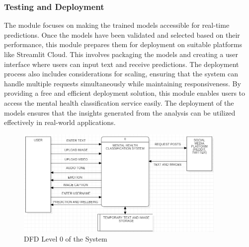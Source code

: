 \subsubsection{Testing and Deployment}
\noindent
The module focuses on making the trained models accessible for real-time predictions. Once the models have been validated and selected based on their performance, this module prepares them for deployment on suitable platforms like Streamlit Cloud. This involves packaging the models and creating a user interface where users can input text and receive predictions. The deployment process also includes considerations for scaling, ensuring that the system can handle multiple requests simultaneously while maintaining responsiveness. By providing a free and efficient deployment solution, this module enables users to access the mental health classification service easily. The deployment of the models ensures that the insights generated from the analysis can be utilized effectively in real-world applications.

\begin{figure}[h!]  
    \centering
    \includegraphics[width=0.9\textwidth]{Images/DFD L0.png}  
    \caption{DFD Level 0 of the System}
    \label{dfdl0123}  %
\end{figure}


